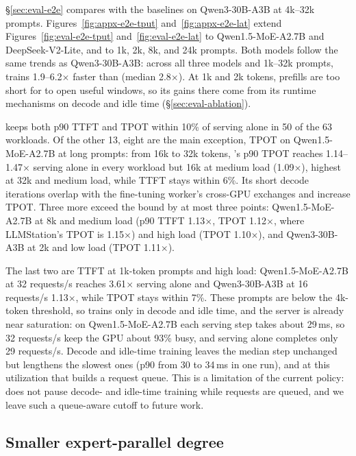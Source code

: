 \S\ref{sec:eval-e2e} compares \sys{} with the baselines on Qwen3-30B-A3B
at 4k--32k prompts. Figures~\ref{fig:appx-e2e-tput} and~\ref{fig:appx-e2e-lat} extend
Figures~\ref{fig:eval-e2e-tput} and~\ref{fig:eval-e2e-lat} to
Qwen1.5-MoE-A2.7B and DeepSeek-V2-Lite, and to 1k, 2k, 8k, and 24k prompts.
Both models follow the same trends as Qwen3-30B-A3B: across all three models and 1k--32k prompts, \sys{} trains 1.9--6.2$\times$ faster than \llmstation{} (median 2.8$\times$). At 1k and 2k
tokens, prefills are too short for \sys{} to open useful windows,
so its gains there come from its runtime mechanisms on decode and
idle time (\S\ref{sec:eval-ablation}).

\sys{} keeps both p90 \ac{TTFT} and \ac{TPOT} within 10\% of serving
alone in 50 of the 63 workloads. Of the other 13, eight are the main
exception, \ac{TPOT} on Qwen1.5-MoE-A2.7B at long prompts: from 16k to
32k tokens, \sys{}'s p90 \ac{TPOT} reaches 1.14--1.47$\times$ serving
alone in every workload but 16k at medium load (1.09$\times$), highest
at 32k and medium load, while \ac{TTFT} stays within 6\%. Its short
decode iterations overlap with the fine-tuning worker's cross-GPU exchanges and
increase \ac{TPOT}. Three more exceed the bound by at most three
points: Qwen1.5-MoE-A2.7B at 8k and medium load (p90 \ac{TTFT}
1.13$\times$, \ac{TPOT} 1.12$\times$, where LLMStation's \ac{TPOT} is
1.15$\times$) and high load (\ac{TPOT} 1.10$\times$), and Qwen3-30B-A3B
at 2k and low load (\ac{TPOT} 1.11$\times$).

The last two are \ac{TTFT} at 1k-token prompts and high load:
Qwen1.5-MoE-A2.7B at 32 requests/s reaches 3.61$\times$ serving alone
and Qwen3-30B-A3B at 16 requests/s 1.13$\times$, while \ac{TPOT} stays
within 7\%. These prompts are below the 4k-token threshold, so \sys{}
trains only in decode and idle time, and the server is already near
saturation: on Qwen1.5-MoE-A2.7B each serving step takes about 29\,ms,
so 32 requests/s keep the GPU about 93\% busy, and serving alone
completes only 29 requests/s. Decode and idle-time training leaves the
median step unchanged but lengthens the slowest ones (p90 from 30 to
34\,ms in one run), and at this utilization that builds a request queue.
This is a limitation of the current policy: \sys{} does not pause
decode- and idle-time training while requests are queued, and we leave
such a queue-aware cutoff to future work.

\subsection{Smaller expert-parallel degree}
\label{sec:appx-tp2}

